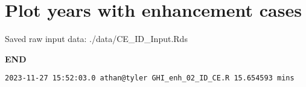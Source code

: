 \documentclass[
  10pt,
  a4paper,oneside]{article}
\begin{document}
\newpage
\FloatBarrier

\hypertarget{plot-years-with-enhancement-cases}{%
\section{Plot years with enhancement cases}\label{plot-years-with-enhancement-cases}}

Saved raw input data: ./data/CE\_ID\_Input.Rds

\textbf{END}

\begin{verbatim}
2023-11-27 15:52:03.0 athan@tyler GHI_enh_02_ID_CE.R 15.654593 mins
\end{verbatim}
\end{document}
